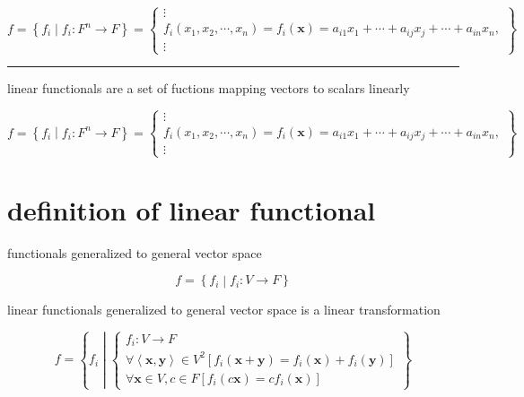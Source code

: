 \documentclass[
]{book}
\theoremstyle{definition}
\theoremstyle{definition}
\theoremstyle{definition}
\theoremstyle{definition}
\theoremstyle{remark}
\begin{document}
\[
f=\left\{ f_{{\scriptscriptstyle i}}\middle|f_{{\scriptscriptstyle i}}:F^{n}\rightarrow F\right\} =\left\{ \begin{array}{c}
\vdots\\
f_{{\scriptscriptstyle i}}\left(x_{{\scriptscriptstyle 1}},x_{{\scriptscriptstyle 2}},\cdots,x_{{\scriptscriptstyle n}}\right)=f_{{\scriptscriptstyle i}}\left(\boldsymbol{x}\right)=a_{{\scriptscriptstyle i1}}x_{{\scriptscriptstyle 1}}+\cdots+a_{{\scriptscriptstyle ij}}x_{{\scriptscriptstyle j}}+\cdots+a_{{\scriptscriptstyle in}}x_{{\scriptscriptstyle n}},\\
\vdots
\end{array}\right\} 
\]

\begin{center}\rule{0.5\linewidth}{0.5pt}\end{center}

linear functionals are a set of fuctions mapping vectors to scalars linearly

\[
f=\left\{ f_{{\scriptscriptstyle i}}\middle|f_{{\scriptscriptstyle i}}:F^{n}\rightarrow F\right\} =\left\{ \begin{array}{c}
\vdots\\
f_{{\scriptscriptstyle i}}\left(x_{{\scriptscriptstyle 1}},x_{{\scriptscriptstyle 2}},\cdots,x_{{\scriptscriptstyle n}}\right)=f_{{\scriptscriptstyle i}}\left(\boldsymbol{x}\right)=a_{{\scriptscriptstyle i1}}x_{{\scriptscriptstyle 1}}+\cdots+a_{{\scriptscriptstyle ij}}x_{{\scriptscriptstyle j}}+\cdots+a_{{\scriptscriptstyle in}}x_{{\scriptscriptstyle n}},\\
\vdots
\end{array}\right\} 
\]

\section{definition of linear functional}\label{definition-of-linear-functional}

functionals generalized to general vector space

\[
f=\left\{ f_{{\scriptscriptstyle i}}\middle|f_{{\scriptscriptstyle i}}:V\rightarrow F\right\} 
\]

linear functionals generalized to general vector space is a linear transformation

\[
f=\left\{ f_{{\scriptscriptstyle i}}\middle|\begin{cases}
f_{{\scriptscriptstyle i}}:V\rightarrow F\\
\forall\left\langle \boldsymbol{x},\boldsymbol{y}\right\rangle \in V^{2}\left[f_{{\scriptscriptstyle i}}\left(\boldsymbol{x}+\boldsymbol{y}\right)=f_{{\scriptscriptstyle i}}\left(\boldsymbol{x}\right)+f_{{\scriptscriptstyle i}}\left(\boldsymbol{y}\right)\right]\\
\forall\boldsymbol{x}\in V,c\in F\left[f_{{\scriptscriptstyle i}}\left(c\boldsymbol{x}\right)=cf_{{\scriptscriptstyle i}}\left(\boldsymbol{x}\right)\right]
\end{cases}\right\} 
\]
\end{document}
